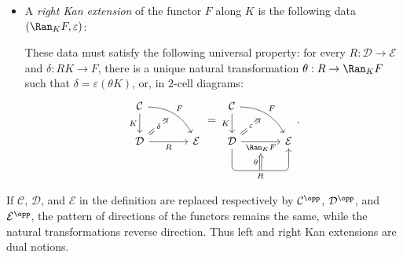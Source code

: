 \begin{definition}[D.\ Kan]
\begin{itemize}
		\item A \emph{right Kan extension} of the functor $F$ along $K$ is the
		following data $(\Ran_K F, \varepsilon)$:
		These data must satisfy the following universal property: for every
		$R: \mathcal{D} \to \mathcal{E}$ and $\delta: RK \to F$, there is a unique
		natural transformation $\theta: R \to \Ran_K F$ such that
		$\delta = \varepsilon (\theta K)$, or, in $2$-cell diagrams:
		\[\begin{tikzcd}[column sep=large]
			\mathcal{C} \arrow[d, "K"'] \arrow[rd, bend left, "F", ""' {name=F}] & \\
			\mathcal{D} \arrow[r, "R"'] \arrow[Rightarrow, to=F, "\delta" description] & \mathcal{E}
		\end{tikzcd} = \begin{tikzcd}[column sep=large]
			\mathcal{C} \arrow[d, "K"'] \arrow[rd, bend left, "F", ""' {name=F}] & \\
			\mathcal{D} \arrow[r, "{\Ran_K F}"' name=A] \arrow[Rightarrow, to=F, "\varepsilon" description] \arrow[r, "R"{below, name=B}, rounded corners, to path={-- ([yshift=-2em]\tikztostart.south) -- ([yshift=-2em] \tikztotarget.south) [midway]\tikztonodes -- (\tikztotarget) }] & \mathcal{E} \arrow[Rightarrow, from=B, to=A, "\theta"]
		\end{tikzcd}. \]
	\end{itemize}
\end{definition}


If $\mathcal{C}$, $\mathcal{D}$, and $\mathcal{E}$ in the definition are
replaced respectively by $\mathcal{C}^{\opp}$, $\mathcal{D}^{\opp}$, and
$\mathcal{E}^{\opp}$, the pattern of directions of the functors remains the
same, while the natural transformations reverse direction. Thus left and
right Kan extensions are dual notions.

